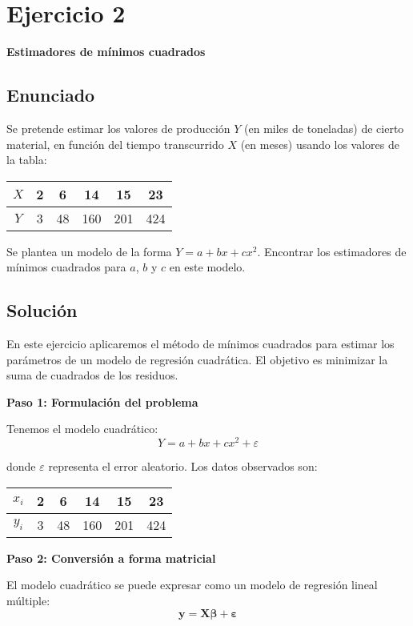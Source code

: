 \documentclass[11pt,a4paper]{article}
\begin{document}
\section{Ejercicio 2}
\textbf{Estimadores de mínimos cuadrados}

\subsection{Enunciado}
Se pretende estimar los valores de producción $Y$ (en miles de toneladas) de cierto material, en función del tiempo transcurrido $X$ (en meses) usando los valores de la tabla:

\begin{center}
\begin{tabular}{|c|c|c|c|c|c|}
\hline
$X$ & 2 & 6 & 14 & 15 & 23 \\
\hline
$Y$ & 3 & 48 & 160 & 201 & 424 \\
\hline
\end{tabular}
\end{center}

Se plantea un modelo de la forma $Y = a + bx + cx^2$. Encontrar los estimadores de mínimos cuadrados para $a$, $b$ y $c$ en este modelo.

\subsection{Solución}

En este ejercicio aplicaremos el método de mínimos cuadrados para estimar los parámetros de un modelo de regresión cuadrática. El objetivo es minimizar la suma de cuadrados de los residuos.

\textbf{Paso 1: Formulación del problema}

Tenemos el modelo cuadrático:
\[
Y = a + bx + cx^2 + \varepsilon
\]

donde $\varepsilon$ representa el error aleatorio. Los datos observados son:
\begin{center}
\begin{tabular}{|c|c|c|c|c|c|}
\hline
$x_i$ & 2 & 6 & 14 & 15 & 23 \\
\hline
$y_i$ & 3 & 48 & 160 & 201 & 424 \\
\hline
\end{tabular}
\end{center}

\textbf{Paso 2: Conversión a forma matricial}

El modelo cuadrático se puede expresar como un modelo de regresión lineal múltiple:
\[
\mathbf{y} = \mathbf{X}\boldsymbol{\beta} + \boldsymbol{\varepsilon}
\]
\end{document}
